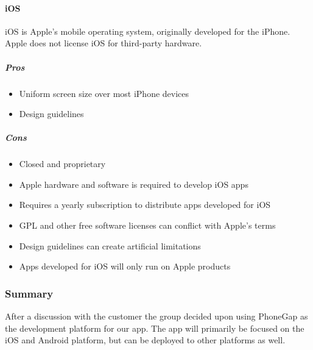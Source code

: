 \paragraph{\bf{iOS}}

	iOS is Apple's mobile operating system, originally developed for the
	iPhone. Apple does not license iOS for third-party hardware.

	\subparagraph{Pros}
	\begin{itemize}
		\item Uniform screen size over most iPhone devices
		\item Design guidelines
	\end{itemize}

	\subparagraph{Cons}
		\begin{itemize}
			\item Closed and proprietary
			\item Apple hardware and software is required to develop iOS apps
			\item Requires a yearly subscription to distribute apps developed
			for iOS
			\item GPL and other free software licenses can conflict with
			Apple's terms
			\item Design guidelines can create artificial limitations
			\item Apps developed for iOS will only run on Apple products
		\end{itemize}




\subsubsection{Summary}
After a discussion with the customer the group decided upon using PhoneGap as the development platform for our app. The app will primarily be focused on the iOS and Android platform, but can be deployed to other platforms as well.
